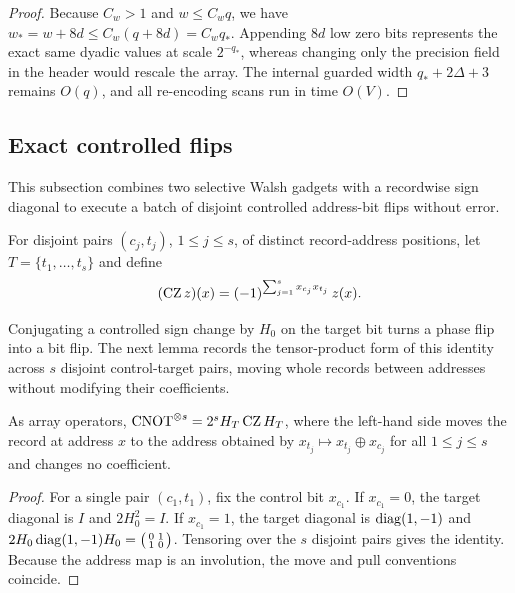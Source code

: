 \begin{proof}
Because $C_w>1$ and $w\le C_wq$, we have $w_*=w+8d\le C_w(q+8d)=C_wq_*$. Appending $8d$ low zero bits represents the
exact same dyadic values at scale $2^{-q_*}$, whereas changing only the precision field in the header would rescale the
array. The internal guarded width $q_*+2\Delta+3$ remains $O(q)$, and all re-encoding scans run in time $O(V)$.
\end{proof}

\subsection{Exact controlled flips}\label{sec:walsh-cnot}

This subsection combines two selective Walsh gadgets with a recordwise sign diagonal to execute a batch of disjoint
controlled address-bit flips without error.

For disjoint pairs $(c_j,t_j)$, $1\le j\le s$, of distinct record-address positions, let $T=\{t_1,\dots,t_s\}$ and define
\begin{equation}\label{eq:walsh-CZ}
  (\mathrm{CZ}\,z)(x)=(-1)^{\sum_{j=1}^sx_{c_j}x_{t_j}}\,z(x).
\end{equation}

Conjugating a controlled sign change by $H_0$ on the target bit turns a phase flip into a bit flip. The next lemma
records the tensor-product form of this identity across $s$ disjoint control-target pairs, moving whole records between
addresses without modifying their coefficients.

\begin{lemma}\label{lem:cnot}
As array operators, $\mathrm{CNOT}^{\otimes s}=2^sH_T\,\mathrm{CZ}\,H_T$, where the left-hand side moves the record at address $x$ to
the address obtained by $x_{t_j}\mapsto x_{t_j}\oplus x_{c_j}$ for all $1\le j\le s$ and changes no coefficient.
\end{lemma}

\begin{proof}
For a single pair $(c_1,t_1)$, fix the control bit $x_{c_1}$. If $x_{c_1}=0$, the target diagonal is $I$ and
$2H_0^2=I$. If $x_{c_1}=1$, the target diagonal is $\operatorname{diag}(1,-1)$ and
$2H_0\operatorname{diag}(1,-1)H_0=\bigl(\begin{smallmatrix}0&1\\1&0\end{smallmatrix}\bigr)$. Tensoring over the $s$ disjoint pairs
gives the identity. Because the address map is an involution, the move and pull conventions coincide.
\end{proof}

